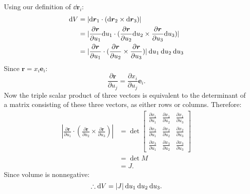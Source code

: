 \begin{enumerate}
    Using our definition of $\dd\boldsymbol{r}_i$:
    \begin{align*}
    \dd V
    &=|\dd\boldsymbol{r}_1\cdot(\dd\boldsymbol{r}_2\times\dd\boldsymbol{r}_3)| \\
    &=|\frac{\partial\boldsymbol{r}}{\partial u_1}\dd u_1\cdot
    (\frac{\partial\boldsymbol{r}}{\partial u_2}\dd u_2\times
    \frac{\partial\boldsymbol{r}}{\partial u_3}\dd u_3)| \\
    &=|\frac{\partial\boldsymbol{r}}{\partial u_1}\cdot
    (\frac{\partial\boldsymbol{r}}{\partial u_2}\times\frac{\partial\boldsymbol{r}}{\partial u_3})|
    \hspace{0.03in}
    \dd u_1\hspace{0.03in}\dd u_2\hspace{0.03in}\dd u_3
    \end{align*}
    Since $\boldsymbol{r}=x_i\boldsymbol{e}_i$:
    $$\frac{\partial\boldsymbol{r}}{\partial u_j}
    =\frac{\partial x_i}{\partial u_j}\boldsymbol{e}_i.$$
    Now the triple scalar product of three vectors is equivalent
    to the determinant of a matrix consisting of these three vectors,
    as either rows or columns. Therefore:
    \begin{align*}
        |\frac{\partial\boldsymbol{r}}{\partial u_1}\cdot
        (\frac{\partial\boldsymbol{r}}{\partial u_2}\times
        \frac{\partial\boldsymbol{r}}{\partial u_3})|
        &=\det
        \begin{bmatrix}
            \displaystyle\frac{\partial x_1}{\partial u_1} & \displaystyle\frac{\partial x_1}{\partial u_2}
            & \displaystyle\frac{\partial x_1}{\partial u_3} \\
            \displaystyle\frac{\partial x_2}{\partial u_1} & \displaystyle\frac{\partial x_2}{\partial u_2}
            & \displaystyle\frac{\partial x_2}{\partial u_3} \\
            \displaystyle\frac{\partial x_3}{\partial u_1} & \displaystyle\frac{\partial x_3}{\partial u_2}
            & \displaystyle\frac{\partial x_3}{\partial u_3}
        \end{bmatrix} \\
        &=\det M \\
        &=J.
    \end{align*}
    Since volume is nonnegative:
    $$\therefore\dd V=|J|\hspace{0.03in}\dd u_1\hspace{0.03in}\dd u_2\hspace{0.03in}\dd u_3.$$
    

\end{enumerate}
